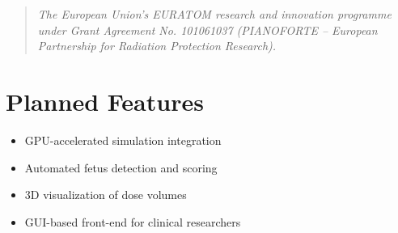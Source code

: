 \documentclass[11pt]{article}
\begin{document}
\begin{quote}
\textit{The European Union’s EURATOM research and innovation programme under Grant Agreement No. 101061037 (PIANOFORTE – European Partnership for Radiation Protection Research).}
\end{quote}

\section{Planned Features}

\begin{itemize}
    \item GPU-accelerated simulation integration
    \item Automated fetus detection and scoring
    \item 3D visualization of dose volumes
    \item GUI-based front-end for clinical researchers
\end{itemize}



\end{document}
